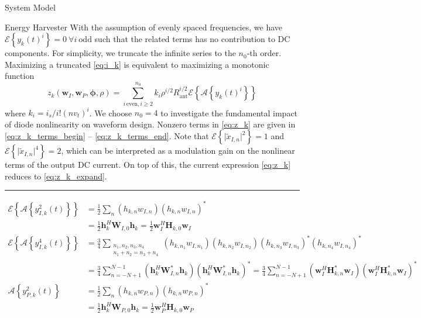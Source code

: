 \documentclass{IEEEtran}
\begin{document}
\begin{section}{System Model}
\begin{subsection}{Energy Harvester}
		With the assumption of evenly spaced frequencies, we have $\mathcal{E}\left\{y_k(t)^i\right\}=0 \ \forall i \ \mathrm{odd}$ such that the related terms has no contribution to DC components. For simplicity, we truncate the infinite series to the $n_0$-th order. Maximizing a truncated \ref{eq:i_k} is equivalent to maximizing a monotonic function \cite{Clerckx2016a}
		\begin{equation}\label{eq:z_k}
			z_k(\boldsymbol{w}_I,\boldsymbol{w}_P,\boldsymbol{\phi},\rho)=\sum_{i\,\text{even},i\ge2}^{n_0}{k_i}{\rho^{i/2}}{R_{\text{ant}}^{i/2}}{\mathcal{E}\left\{\mathcal{A}\left\{y_k(t)^i\right\}\right\}}
		\end{equation}
		where $k_i=i_s/i!(nv_t)^i$. We choose $n_0=4$ to investigate the fundamental impact of diode nonlinearity on waveform design. Nonzero terms in \ref{eq:z_k} are given in \ref{eq:z_k_terms_begin} -- \ref{eq:z_k_terms_end}. Note that $\mathcal{E}\left\{\lvert\tilde{x}_{I,n}\rvert^2\right\}=1$ and $\mathcal{E}\left\{\lvert\tilde{x}_{I,n}\rvert^4\right\}=2$, which can be interpreted as a modulation gain on the nonlinear terms of the output DC current. On top of this, the current expression \ref{eq:z_k} reduces to \ref{eq:z_k_expand}.
		\begin{figure*}[b]
			\hrule
			\begin{align}
				\mathcal{E}\left\{\mathcal{A}\left\{y_{I,k}^2(t)\right\}\right\}
				& = \frac{1}{2}\sum_n{(h_{k,n}w_{I,n})(h_{k,n}w_{I,n})^*}\label{eq:z_k_terms_begin}\\
				& = \frac{1}{2}\boldsymbol{h}_k^H\boldsymbol{W}_{I,0}\boldsymbol{h}_k = \frac{1}{2}\boldsymbol{w}_I^H\boldsymbol{H}_{k,0}\boldsymbol{w}_I\\
				\mathcal{E}\left\{\mathcal{A}\left\{y_{I,k}^4(t)\right\}\right\}
				& = \frac{3}{4}\sum_{\substack{{n_1},{n_2},{n_3},{n_4}\\{n_1}+{n_2}={n_3}+{n_4}}}{(h_{k,{n_1}}w_{I,{n_1}})(h_{k,{n_2}}w_{I,{n_2}})(h_{k,{n_3}}w_{I,{n_3}})^*(h_{k,{n_4}}w_{I,{n_4}})^*}\\
				& = \frac{3}{4}\sum_{n=-N+1}^{N-1}(\boldsymbol{h}_k^H\boldsymbol{W}_{I,n}^*\boldsymbol{h}_k)(\boldsymbol{h}_k^H\boldsymbol{W}_{I,n}^*\boldsymbol{h}_k)^* = \frac{3}{4}\sum_{n=-N+1}^{N-1}(\boldsymbol{w}_I^H\boldsymbol{H}_{k,n}^*\boldsymbol{w}_I)(\boldsymbol{w}_I^H\boldsymbol{H}_{k,n}^*\boldsymbol{w}_I)^*\\
				\mathcal{A}\left\{y_{P,k}^2(t)\right\}
				& = \frac{1}{2}\sum_n{(h_{k,n}w_{P,n})(h_{k,n}w_{P,n})^*}\\
				& = \frac{1}{2}\boldsymbol{h}_k^H\boldsymbol{W}_{P,0}\boldsymbol{h}_k = \frac{1}{2}\boldsymbol{w}_P^H\boldsymbol{H}_{k,0}\boldsymbol{w}_P\\

\end{align}
\end{figure*}
\end{subsection}
\end{section}
\end{document}
